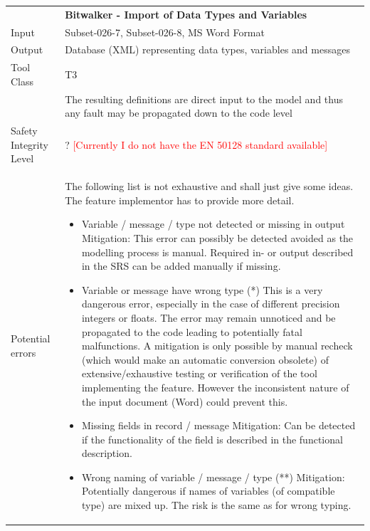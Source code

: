 \begin{longtable}{lp{}}
&\textbf{Bitwalker - Import of Data Types and Variables}\\
Input&Subset-026-7, Subset-026-8, MS Word Format\\
Output&Database (XML) representing data types, variables and messages\\
Tool Class&T3\\
          &The resulting definitions are direct input to the model and thus any fault may be propagated down to the code level\\
Safety Integrity Level&? \textcolor{red}{[Currently I do not have the EN 50128 standard available]}\\
Potential errors&The following list is not exhaustive and shall just give some ideas. The feature implementor has to provide more detail.
                                \begin{itemize}
                                  \item Variable / message / type not detected or missing in output\linebreak
                                       Mitigation: This error can possibly be detected avoided as the modelling process is manual. Required in- or output described in the
                                                   SRS can be added manually if missing.
                                  \item Variable or message have wrong type (*)
                                       This is a very dangerous error, especially in the case of different precision integers or floats. The error may
                                       remain unnoticed and be propagated to the code leading to potentially fatal malfunctions. A mitigation is only possible by
                                       manual recheck (which would make an automatic conversion obsolete) of extensive/exhaustive testing or verification of the tool 
                                       implementing the feature. However the inconsistent nature of the input document (Word) could prevent this.
                                  \item Missing fields in record / message
                                       Mitigation: Can be detected if the functionality of the field is described in the functional description.
                                  \item Wrong naming of variable / message / type (**)
                                       Mitigation: Potentially dangerous if names of variables (of compatible type) are mixed up. The risk is the same as for wrong typing.

\end{itemize}
\end{longtable}
